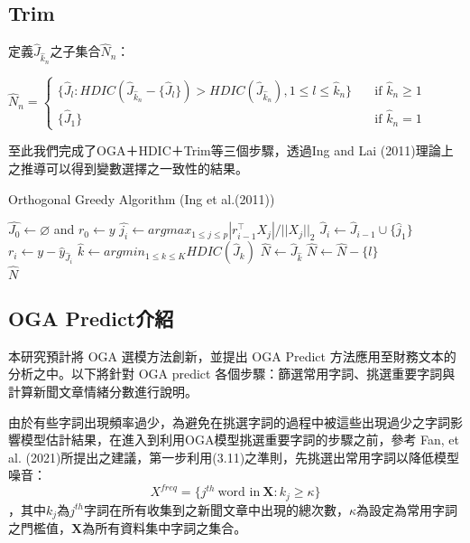\subsection{Trim}
定義$\hat{J}_{\hat{k}_n}$之子集合$\hat{N}_{n}$：\\
\begin{center}
$\displaystyle
\hat{N}_{n} = 
\begin{cases}
\{\hat{J}_l:HDIC(\hat{J}_{\hat{k}_n}-\{\hat{J}_l\})>HDIC(\hat{J}_{\hat{k}_n}), 1 \leq l \leq \hat{k}_n\} & \quad \text{if } \hat{k}_n \geq 1 \\
\{\hat{J}_1\} & \quad \text{if } \hat{k}_n = 1
\end{cases}
$
\end{center}
至此我們完成了OGA＋HDIC＋Trim等三個步驟，透過Ing and Lai (2011)理論上之推導可以得到變數選擇之一致性的結果。
\\[2ex]


\begin{algorithm}[h]
  \caption{Orthogonal Greedy Algorithm (Ing et al.(2011))}
  \label{alg::Orthogonal Greedy Algorithm}
  \begin{algorithmic}[1]
  \State $\hat{J_0} \leftarrow \varnothing $ and $ r_0 \leftarrow y $ 
  \State $\hat{j_i} \leftarrow argmax_{1 \le j \le p}|r^\top_{i-1}X_j|/||X_j||_2 $
  \State $ \hat{J}_i\leftarrow\hat{J}_{i-1}\cup\{\hat{j}_1\} $
  \State $ r_i \leftarrow y - \hat{y}_{\hat{J}_i} $
  \EndFor
  \State $\hat{k} \leftarrow argmin_{1 \leq k \leq K}HDIC(\hat{J}_k)$
  \State $\hat{N} \leftarrow \hat{J}_{\hat{k}}$
  \State $\hat{N} \leftarrow \hat{N} - \{l\}$
  \EndIf
  \EndFor
  \EndIf \\
  \Return $\hat{N}$
  \end{algorithmic}
\end{algorithm}



\subsection{OGA Predict介紹}
本研究預計將 OGA 選模方法創新，並提出 OGA Predict 方法應用至財務文本的分析之中。以下將針對 OGA predict 各個步驟：篩選常用字詞、挑選重要字詞與計算新聞文章情緒分數進行說明。

由於有些字詞出現頻率過少，為避免在挑選字詞的過程中被這些出現過少之字詞影響模型估計結果，在進入到利用OGA模型挑選重要字詞的步驟之前，參考 Fan, et al. (2021)所提出之建議，第一步利用(3.11)之準則，先挑選出常用字詞以降低模型噪音：
\begin{equation}
X^{freq}=\{j^{th}~\text{word in}~\bm{X}:k_j \geq \kappa \}
\end{equation}
，其中$k_{j}$為$j^{th}$字詞在所有收集到之新聞文章中出現的總次數，$\kappa$為設定為常用字詞之門檻值，$\bm{X}$為所有資料集中字詞之集合。

